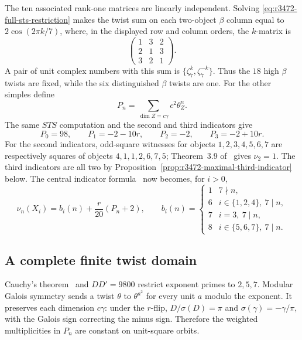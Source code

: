 The ten associated rank-one matrices are linearly independent.
Solving \eqref{eq:r3472-full-sts-restriction} makes the twist sum on
each two-object $\beta$ column equal to $2\cos(2\pi k/7)$, where,
in the displayed row and column orders, the $k$-matrix is
\[
 \begin{pmatrix}1&3&2\\2&1&3\\3&2&1\end{pmatrix}.
\]
A pair of unit complex numbers with this sum is
$\{\zeta_7^k,\zeta_7^{-k}\}$. Thus the $18$ high $\beta$ twists
are fixed, while the six distinguished $\beta$ twists are one.
For the other simples define
\[
 P_n=\sum_{\dim Z=c\gamma}c^2\theta_Z^n.
\]
The same $STS$ computation and the second and third indicators give
\begin{equation}\label{eq:r3472-first-three-moments}
 P_0=98,\qquad P_1=-2-10r,\qquad P_2=-2,\qquad P_3=-2+10r.
\end{equation}
For the second indicators, odd-square witnesses for objects
$1,2,3,4,5,6,7$ are respectively squares of objects
$4,1,1,2,6,7,5$; Theorem~3.9 of~\cite{LPRV} gives $\nu_2=1$.
The third indicators are all two by
Proposition~\ref{prop:r3472-maximal-third-indicator} below.
The central indicator formula~\cite{NgIndicators} now becomes, for
$i>0$,
\begin{equation}\label{eq:r3472-indicator-moments}
 \nu_n(X_i)=b_i(n)+\frac{r}{20}(P_n+2),\qquad
 b_i(n)=\begin{cases}
 1&7\nmid n,\\
 6&i\in\{1,2,4\},\ 7\mid n,\\
 7&i=3,\ 7\mid n,\\
 8&i\in\{5,6,7\},\ 7\mid n.
 \end{cases}
\end{equation}

\subsection{A complete finite twist domain}
Cauchy's theorem~\cite[Theorem~3.9]{BNRWCauchy} and
$DD'=9800$ restrict exponent primes to $2,5,7$.
Modular Galois symmetry sends a twist $\theta$ to $\theta^{a^2}$
for every unit $a$ modulo the exponent. It preserves each dimension
$c\gamma$: under the $r$-flip, $D/\sigma(D)=\pi$ and
$\sigma(\gamma)=-\gamma/\pi$, with the Galois sign correcting the
minus sign. Therefore the weighted multiplicities in $P_n$ are constant
on unit-square orbits.


